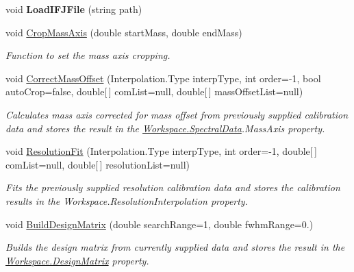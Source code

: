 \begin{DoxyCompactItemize}
\mbox{\label{class_isotope_fit_1_1_workspace_aba9a547d376319e836898f4878ce7aab}} 
void {\bfseries Load\+I\+F\+J\+File} (string path)
\item 
void \mbox{\hyperlink{class_isotope_fit_1_1_workspace_a9c1e21aff90947ff3414ac9d90472452}{Crop\+Mass\+Axis}} (double start\+Mass, double end\+Mass)
\begin{DoxyCompactList}\small\item\em Function to set the mass axis cropping. \end{DoxyCompactList}\item 
void \mbox{\hyperlink{class_isotope_fit_1_1_workspace_a188d75c84db3eb6b5c3812e44eb95695}{Correct\+Mass\+Offset}} (Interpolation.\+Type interp\+Type, int order=-\/1, bool auto\+Crop=false, double\mbox{[}$\,$\mbox{]} com\+List=null, double\mbox{[}$\,$\mbox{]} mass\+Offset\+List=null)
\begin{DoxyCompactList}\small\item\em Calculates mass axis corrected for mass offset from previously supplied calibration data and stores the result in the \mbox{\hyperlink{class_isotope_fit_1_1_workspace_a1d6cc2dd07cbfe920da9f1bffc9b32c2}{Workspace.\+Spectral\+Data}}.Mass\+Axis property. \end{DoxyCompactList}\item 
void \mbox{\hyperlink{class_isotope_fit_1_1_workspace_ab8d4da3f0d257537fde144fb34e4cc32}{Resolution\+Fit}} (Interpolation.\+Type interp\+Type, int order=-\/1, double\mbox{[}$\,$\mbox{]} com\+List=null, double\mbox{[}$\,$\mbox{]} resolution\+List=null)
\begin{DoxyCompactList}\small\item\em Fits the previously supplied resolution calibration data and stores the calibration results in the Workspace.\+Resolution\+Interpolation property. \end{DoxyCompactList}\item 
void \mbox{\hyperlink{class_isotope_fit_1_1_workspace_a760f024c67d57242c40c558298bd1878}{Build\+Design\+Matrix}} (double search\+Range=1, double fwhm\+Range=0.)
\begin{DoxyCompactList}\small\item\em Builds the design matrix from currently supplied data and stores the result in the \mbox{\hyperlink{class_isotope_fit_1_1_workspace_ae24a2ee8f965fb2ed7ad3a592163271d}{Workspace.\+Design\+Matrix}} property. \end{DoxyCompactList}\item 

\end{DoxyCompactItemize}
